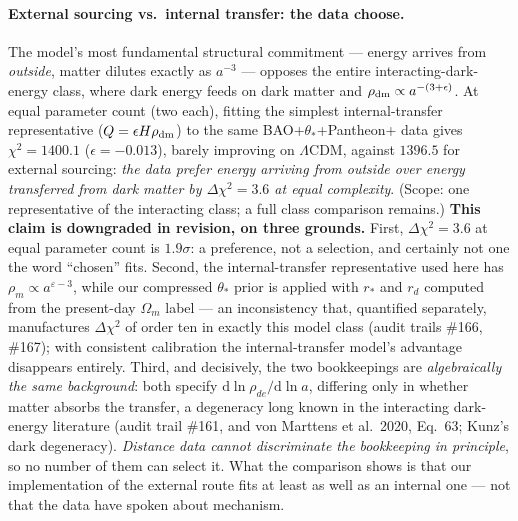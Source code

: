 \documentclass[11pt]{article}
\begin{document}
\paragraph{External sourcing vs.\ internal transfer: the data choose.} The model's most fundamental structural commitment --- energy arrives from \emph{outside}, matter dilutes exactly as $a^{-3}$ --- opposes the entire interacting-dark-energy class, where dark energy feeds on dark matter and $\rho_{\rm dm} \propto a^{-(3+\epsilon)}$. At equal parameter count (two each), fitting the simplest internal-transfer representative ($Q = \epsilon H \rho_{\rm dm}$) to the same BAO+$\theta_*$+Pantheon+ data gives $\chi^2 = 1400.1$ ($\epsilon = -0.013$), barely improving on $\Lambda$CDM, against $1396.5$ for external sourcing: \emph{the data prefer energy arriving from outside over energy transferred from dark matter by $\Delta\chi^2 = 3.6$ at equal complexity}. (Scope: one representative of the interacting class; a full class comparison remains.) \textbf{This claim is downgraded in revision, on three grounds.} First, $\Delta\chi^2 = 3.6$ at equal parameter count is $1.9\sigma$: a preference, not a selection, and certainly not one the word ``chosen'' fits. Second, the internal-transfer representative used here has $\rho_m \propto a^{\varepsilon-3}$, while our compressed $\theta_*$ prior is applied with $r_*$ and $r_d$ computed from the present-day $\Omega_m$ label --- an inconsistency that, quantified separately, manufactures $\Delta\chi^2$ of order ten in exactly this model class (audit trails \#166, \#167); with consistent calibration the internal-transfer model's advantage disappears entirely. Third, and decisively, the two bookkeepings are \emph{algebraically the same background}: both specify $\mathrm{d}\ln\rho_{de}/\mathrm{d}\ln a$, differing only in whether matter absorbs the transfer, a degeneracy long known in the interacting dark-energy literature (audit trail \#161, and von Marttens et al.\ 2020, Eq.~63; Kunz's dark degeneracy). \emph{Distance data cannot discriminate the bookkeeping in principle}, so no number of them can select it. What the comparison shows is that our implementation of the external route fits at least as well as an internal one --- not that the data have spoken about mechanism.
\end{document}
